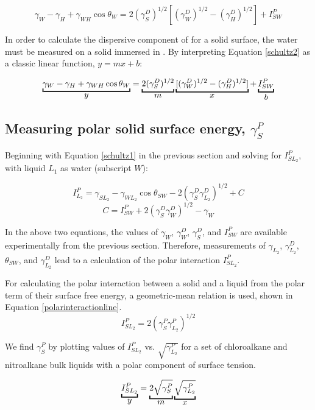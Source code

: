 \begin{equation} 
\label{schultz2}
	\gamma_{W}-\gamma_{H}+\gamma_{WH}\cos\theta_{W} = 2(\gamma_{S}^{D})^{1/2}[(\gamma_{W}^{D})^{1/2}-(\gamma_{H}^{D})^{1/2}] + I_{SW}^{P} 
\end{equation} 

In order to calculate the dispersive component of \gamSV for a solid surface, the water \ca must be measured on a solid immersed in \nalk[s]. By interpreting Equation \ref{schultz2} as a classic linear function, $y = mx + b$:

\[
\underbracket{\gamma_{W}-\gamma_{H}+\gamma_{WH}\cos\theta_{W}}_{\text{\normalsize{$y$}}} =
\underbracket{2(\gamma_{S}^{D})^{1/2}}_{\text{\normalsize{$m$}}}  
\underbracket{[(\gamma_{W}^{D})^{1/2}-(\gamma_{H}^{D})^{1/2}] }_{\text{\normalsize{$x$}}} + 
\underbracket{I_{SW}^{P}}_{\text{\normalsize{$b$}}} 
\] 

\subsection{Measuring polar solid surface energy, $\gamma_{S}^{P}$}

Beginning with Equation \ref{schultz1} in the previous section and solving for $ I_{SL_{2}}^{P} $, with liquid $L_1$ as water (subscript $ W $):

\begin{equation}
	I_{L_2}^{P} = \gamma_{SL_2}-\gamma_{WL_2}\cos\theta_{SW}-2(\gamma_{S}^{D}\gamma_{L_2}^{D})^{1/2} + C
\end{equation}
\begin{equation}
	C = I_{SW}^{P} + 2(\gamma_{S}^{D}\gamma_{W}^{D})^{1/2} - \gamma_W
\end{equation}

In the above two equations, the values of $ \gamma_W$, $ \gamma_{W}^{D} $, $ \gamma_{S}^{D} $, and $I_{SW}^{P}$ are available experimentally from the previous section. Therefore, measurements of $ \gamma_{L_2}$, $ \gamma_{L_2}^{D} $, $\theta_{SW}$, and $ \gamma_{L_2}^{D} $ lead to a calculation of the polar interaction $I_{SL_{2}}^{P}$. 

For calculating the polar interaction between a solid and a liquid from the polar term of their surface free energy, a geometric-mean relation is used, shown in Equation \ref{polarinteractionline}. 
\begin{equation} \label{polarinteractionline}
	I_{SL_{2}}^{P} = 2(\gamma_{S}^{P}\gamma_{L_{2}}^{P})^{1/2}
\end{equation}

We find $ \gamma_{S}^{P} $ by plotting values of $ I_{SL_{2}}^{P} $ vs. $\sqrt{ \gamma_{L_{2}}^{P} }$ for a set of chloroalkane and nitroalkane bulk liquids with a polar component of surface tension.

\[
\underbracket{ I_{SL_{2}}^{P}}_{\textbf{\normalsize{$y$}} } =
\underbracket{ 2\sqrt{\gamma_{S}^{P} }} _{\textbf{\normalsize{$m$}} }
\underbracket{ \sqrt{\gamma_{L_{2}}^{P} }} _{\textbf{\normalsize{$x$}}  }
\]



